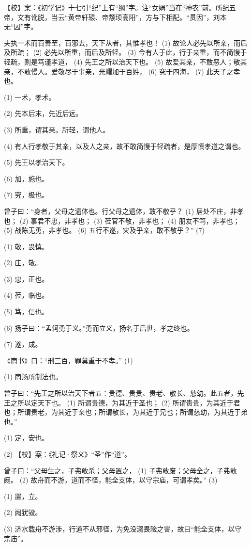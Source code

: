 \documentclass[12pt,UTF8]{ctexbook}
\begin{document}
【校】案：《初学记》十七引“纪”上有“纲”字。注“女娲”当在“神农”前。所纪五帝，文有讹脱，当云“黄帝轩辕、帝颛顼高阳”，方与下相配。“贯因”，刘本无“因”字。

夫执一术而百善至，百邪去，天下从者，其惟孝也！ (1) 故论人必先以所亲，而后及所疏； (2) 必先以所重，而后及所轻。 (3) 今有人于此，行于亲重，而不简慢于轻疏，则是笃谨孝道， (4) 先王之所以治天下也。 (5) 故爱其亲，不敢恶人；敬其亲，不敢慢人。爱敬尽于事亲，光耀加于百姓， (6) 究于四海， (7) 此天子之孝也。

(1) 一术，孝术。

(2) 先本后末，先近后远。

(3) 所重，谓其亲。所轻，谓他人。

(4) 有人行孝敬于其亲，以及人之亲，故不敢简慢于轻疏者，是厚慎孝道之谓也。

(5) 先王以孝治天下。

(6) 加，施也。

(7) 究，极也。

曾子曰：“身者，父母之遗体也。行父母之遗体，敢不敬乎？ (1) 居处不庄，非孝也； (2) 事君不忠，非孝也； (3) 莅官不敬，非孝也； (4) 朋友不笃，非孝也； (5) 战陈无勇，非孝也。 (6) 五行不遂，灾及乎亲，敢不敬乎？” (7)

(1) 敬，畏慎。

(2) 庄，敬。

(3) 忠，正也。

(4) 莅，临也。

(5) 笃，信也。

(6) 扬子曰：“孟轲勇于义。”勇而立义，扬名于后世，孝之终也。

(7) 遂，成。

《商书》曰：“刑三百，罪莫重于不孝。” (1)

(1) 商汤所制法也。

曾子曰：“先王之所以治天下者五：贵德、贵贵、贵老、敬长、慈幼。此五者，先王之所以定天下也。 (1) 所谓贵德，为其近于圣也； (2) 所谓贵贵，为其近于君也；所谓贵老，为其近于亲也；所谓敬长，为其近于兄也；所谓慈幼，为其近于弟也。”

(1) 定，安也。

(2) 【校】案：《礼记·祭义》“圣”作“道”。

曾子曰：“父母生之，子弗敢杀；父母置之， (1) 子弗敢废；父母全之，子弗敢阙。 (2) 故舟而不游，道而不径，能全支体，以守宗庙，可谓孝矣。” (3)

(1) 置，立。

(2) 阙犹毁。

(3) 济水载舟不游涉，行道不从邪径，为免没溺畏险之害，故曰“能全支体，以守宗庙”。
\end{document}
